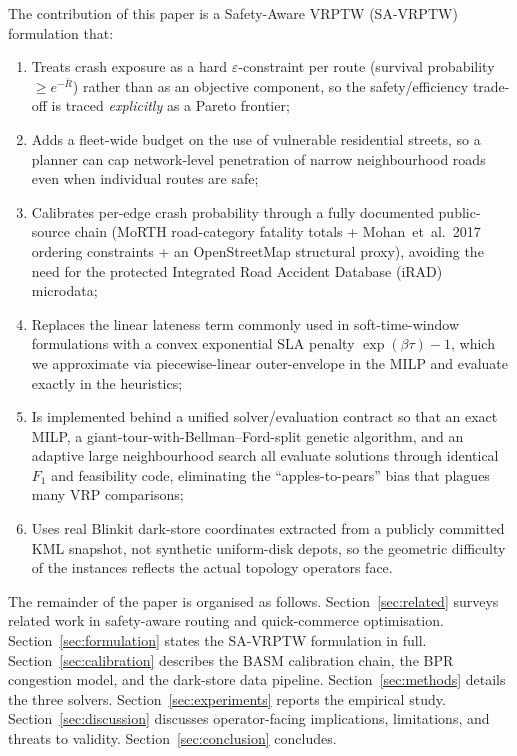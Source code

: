 \documentclass{ieeeaccess}
\begin{document}
The contribution of this paper is a Safety-Aware VRPTW (SA-VRPTW)
formulation that:
\begin{enumerate}
\item Treats crash exposure as a hard $\varepsilon$-constraint per route
(survival probability $\geq e^{-\bar{R}}$) rather than as an objective
component, so the safety/efficiency trade-off is traced
\emph{explicitly} as a Pareto frontier;
\item Adds a fleet-wide budget on the use of vulnerable residential
streets, so a planner can cap network-level penetration of narrow
neighbourhood roads even when individual routes are safe;
\item Calibrates per-edge crash probability through a fully documented
public-source chain (MoRTH road-category fatality totals
\cite{morth2022} + Mohan~et~al.~2017
\cite{mohan2017} ordering constraints
+ an OpenStreetMap structural proxy), avoiding the need for the
protected Integrated Road Accident Database (iRAD) microdata;
\item Replaces the linear lateness term commonly used in soft-time-window
formulations with a convex exponential SLA penalty
$\exp(\beta \tau) - 1$, which we approximate via piecewise-linear
outer-envelope in the MILP and evaluate exactly in the heuristics;
\item Is implemented behind a unified solver/evaluation contract so
that an exact MILP, a giant-tour-with-Bellman--Ford-split genetic
algorithm, and an adaptive large neighbourhood search all evaluate
solutions through identical $F_1$ and feasibility code, eliminating
the ``apples-to-pears'' bias that plagues many VRP comparisons;
\item Uses real Blinkit dark-store coordinates extracted from a
publicly committed KML snapshot, not synthetic uniform-disk depots, so
the geometric difficulty of the instances reflects the actual
topology operators face.
\end{enumerate}

The remainder of the paper is organised as follows. Section~\ref{sec:related}
surveys related work in safety-aware routing and quick-commerce
optimisation. Section~\ref{sec:formulation} states the SA-VRPTW
formulation in full. Section~\ref{sec:calibration} describes the BASM
calibration chain, the BPR congestion model, and the dark-store data
pipeline. Section~\ref{sec:methods} details the three solvers.
Section~\ref{sec:experiments} reports the empirical study.
Section~\ref{sec:discussion} discusses operator-facing implications,
limitations, and threats to validity. Section~\ref{sec:conclusion}
concludes.
\end{document}
